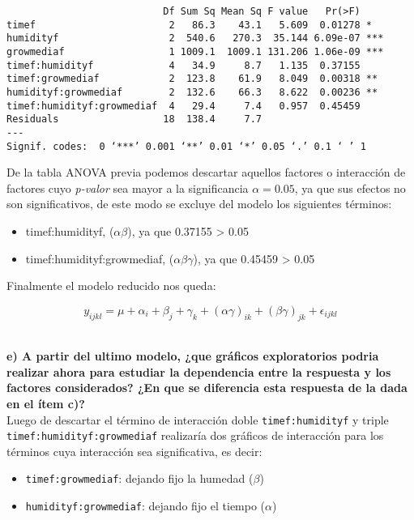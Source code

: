 \documentclass[11pt]{article}
\providecommand{\tightlist}{%
      \setlength{\itemsep}{0pt}\setlength{\parskip}{0pt}}
\begin{document}
    
    \begin{verbatim}
                           Df Sum Sq Mean Sq F value   Pr(>F)    
timef                       2   86.3    43.1   5.609  0.01278 *  
humidityf                   2  540.6   270.3  35.144 6.09e-07 ***
growmediaf                  1 1009.1  1009.1 131.206 1.06e-09 ***
timef:humidityf             4   34.9     8.7   1.135  0.37155    
timef:growmediaf            2  123.8    61.9   8.049  0.00318 ** 
humidityf:growmediaf        2  132.6    66.3   8.622  0.00236 ** 
timef:humidityf:growmediaf  4   29.4     7.4   0.957  0.45459    
Residuals                  18  138.4     7.7                     
---
Signif. codes:  0 ‘***’ 0.001 ‘**’ 0.01 ‘*’ 0.05 ‘.’ 0.1 ‘ ’ 1
    \end{verbatim}

    
    De la tabla ANOVA previa podemos descartar aquellos factores o
interacción de factores cuyo \emph{p-valor} sea mayor a la significancia
\(\alpha = 0.05\), ya que sus efectos no son significativos, de este modo se excluye del modelo los siguientes términos:

\begin{itemize}
\tightlist
\item
  timef:humidityf, (\(\alpha \beta\)), ya que 0.37155 > 0.05
\item
  timef:humidityf:growmediaf, (\(\alpha \beta \gamma\)), ya que 0.45459 > 0.05
\end{itemize}

Finalmente el modelo reducido nos queda:

\[y_{ijkl} = \mu + \alpha_i + \beta_j + \gamma_k + (\alpha \gamma)_{ik} + (\beta \gamma)_{jk} + \epsilon_{ijkl}\]\

    \textbf{e) A partir del ultimo modelo, ¿que gráficos exploratorios
podria realizar ahora para estudiar la dependencia entre la respuesta y
los factores considerados? ¿En que se diferencia esta respuesta de la
dada en el ítem c)?}\\

Luego de descartar el término de interacción doble
\texttt{timef:humidityf} y triple \texttt{timef:humidityf:growmediaf}
realizaría dos gráficos de interacción para los términos cuya
interacción sea significativa, es decir:

\begin{itemize}
\tightlist
\item
  \texttt{timef:growmediaf}: dejando fijo la humedad (\(\beta\))
\item
  \texttt{humidityf:growmediaf}: dejando fijo el tiempo (\(\alpha\))
\end{itemize}
\end{document}
